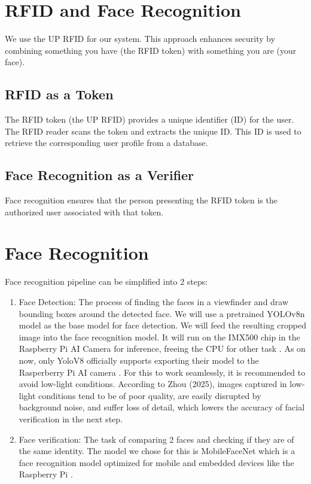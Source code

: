 \section{RFID and Face Recognition}
 We use the UP RFID for our system. This approach enhances security by combining something you have (the RFID token) with something you are (your face).
 \subsection{RFID as a Token}
 The RFID token (the UP RFID) provides a unique identifier (ID) for the user. The RFID reader scans the token and extracts the unique ID. This ID is used to retrieve the corresponding user profile from a database.
 \subsection{Face Recognition as a Verifier}
  Face recognition ensures that the person presenting the RFID token is the authorized user associated with that token.
 	
\section{Face Recognition}
Face recognition pipeline can be simplified into 2 steps:
\begin{enumerate}
	\item Face Detection: The process of finding the faces in a viewfinder and draw bounding boxes around the detected face. We will use a pretrained YOLOv8n model as the base model for face detection. We will feed the resulting cropped image into the face recognition model. It will run on the IMX500 chip in the Raspberry Pi AI Camera for inference, freeing the CPU for other task \cite{sony_imx500}. As on now, only YoloV8 officially supports exporting their model to the Rasperberry Pi AI camera \cite{ultralytics_imx500}. For this to work seamlessly, it is recommended to avoid low-light conditions. According to Zhou (2025), images captured in low-light conditions tend to be of poor quality, are easily disrupted by background noise, and suffer loss of detail, which lowers the accuracy of facial verification in the next step.
	
	\item Face verification: The task of comparing 2 faces and checking if they are of the same identity. The model we chose for this is MobileFaceNet which is a face recognition model optimized for mobile and embedded devices like the Raspberry Pi \cite{chen2018mobilefacenets}.
\end{enumerate}

